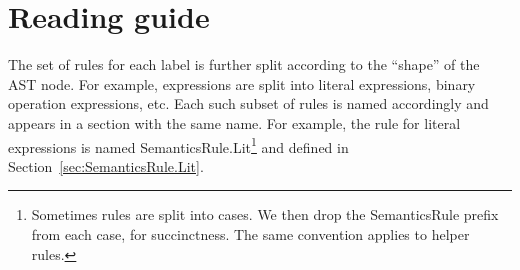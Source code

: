 \documentclass{book}
\newcommand\secref[1]{Section~\ref{sec:#1}}
\begin{document}

\chapter{Reading guide}

The set of rules for each label is further split according to the ``shape'' of the AST node.
For example, expressions are split into literal expressions, binary operation expressions, etc.
Each such subset of rules is named accordingly and appears in a section with the same name.
For example, the rule for literal expressions is named SemanticsRule.Lit\footnote{Sometimes rules are split into cases.
We then drop the SemanticsRule prefix from each case, for succinctness.
The same convention applies to helper rules.} and defined in
\secref{SemanticsRule.Lit}.
\end{document}
